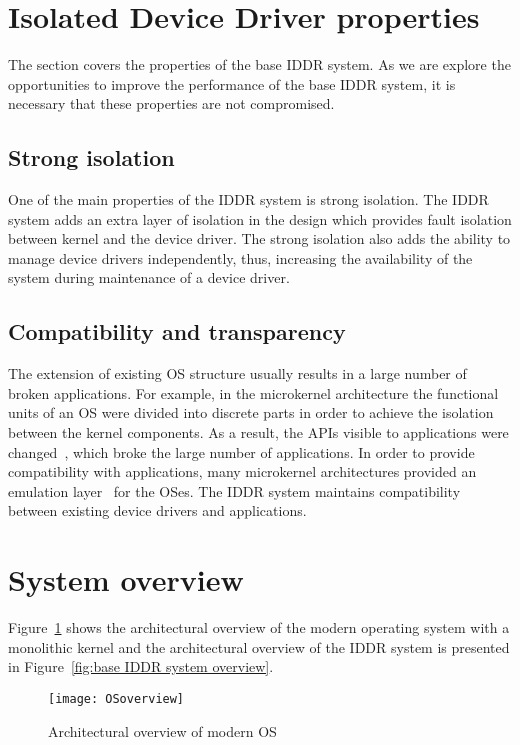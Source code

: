 \section{Isolated Device Driver properties}
\label{sec:properties}
The section covers the properties of the base IDDR system. As we are explore the opportunities to improve the performance of the base IDDR system, it is necessary that these properties are not compromised.

\subsection*{Strong isolation}
One of the main properties of the IDDR system is strong isolation. The IDDR system adds an extra layer of isolation in the design which provides fault isolation between kernel and the device driver. The strong isolation also adds the ability to manage device drivers independently, thus, increasing the availability of the system during maintenance of a device driver.

\subsection*{Compatibility and transparency} 
The extension of existing OS structure usually results in a large number of broken applications. For example, in the microkernel architecture the functional units of an OS were divided into discrete parts in order to achieve the isolation between the kernel components. As a result, the APIs visible to applications were changed~\cite{Heiser06arevirtualmachine}, which broke the large number of applications. In order to provide compatibility with applications, many microkernel architectures provided an emulation layer~\cite{Heiser06arevirtualmachine} for the OSes. The IDDR system maintains compatibility between existing device drivers and applications.

\section{System overview}\label{overview}

Figure~\ref{fig:monolithic} shows the architectural overview of the modern operating system with a monolithic kernel and the architectural overview of the IDDR system is presented in Figure~\ref{fig:base IDDR system overview}.
\begin{figure}[!ht]
\centering
\texttt{[image: OSoverview]}
\caption{Architectural overview of modern OS}
\label{fig:monolithic}
\end{figure}

